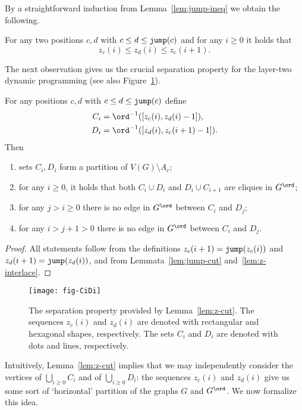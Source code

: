 By a straightforward induction from Lemma~\ref{lem:jump-ineq} we obtain the following.
\begin{lemma}\label{lem:z-interlace}
For any two positions $c,d$ with $c \leq d \leq \mathtt{jump}(c)$
and for any $i \geq 0$ it holds that
$$z_c(i) \leq z_d(i) \leq z_c(i+1).$$
\end{lemma}
The next observation gives us the crucial separation property for the layer-two dynamic programming (see also Figure~\ref{fig:CiDi}).
\begin{lemma}\label{lem:z-cut}
For any positions $c,d$ with $c \leq d \leq \mathtt{jump}(c)$
define
\begin{align*}
C_i &= \ord^{-1}([z_c(i),z_d(i)-1]),\\
D_i &= \ord^{-1}([z_d(i),z_c(i+1)-1]).
\end{align*}
Then
\begin{enumerate}
\item sets $C_i,D_i$ form a partition of $V(G)\setminus A_c$;
\item for any $i \geq 0$, it holds that both $C_i \cup D_i$ and $D_i \cup C_{i+1}$
are cliques in $G^\ord$;
\item for any $j > i \geq 0$ there is no edge in $G^\ord$ between $C_i$ and $D_j$;
\item for any $i > j+1 > 0$ there is no edge in $G^\ord$ between $C_i$ and $D_j$.
\end{enumerate}
\end{lemma}
\begin{proof}
All statements follow from the definitions $z_c(i+1) = \mathtt{jump}(z_c(i))$
and $z_d(i+1) = \mathtt{jump}(z_d(i))$, and from Lemmata~\ref{lem:jump-cut} and~\ref{lem:z-interlace}.
\end{proof}

\begin{figure}
\centering
\texttt{[image: fig-CiDi]}
\caption{The separation property provided by Lemma~\ref{lem:z-cut}.
The sequences $z_c(i)$ and $z_d(i)$ are denoted with rectangular and hexagonal shapes, respectively.
The sets $C_i$ and $D_i$ are denoted with dots and lines, respectively.}
\label{fig:CiDi}
\end{figure}


Intuitively, Lemma~\ref{lem:z-cut} implies that we may independently consider the vertices of
$\bigcup_{i \geq 0} C_i$ and of $\bigcup_{i \geq 0} D_i$: the sequences $z_c(i)$ and $z_d(i)$
give us some sort of `horizontal' partition of the graphs $G$ and $G^\ord$.
We now formalize this idea.


